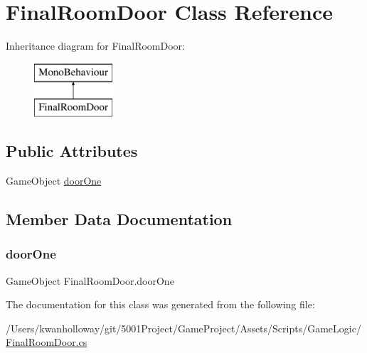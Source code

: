 \hypertarget{class_final_room_door}{}\section{Final\+Room\+Door Class Reference}
\label{class_final_room_door}
Inheritance diagram for Final\+Room\+Door\+:\begin{figure}[H]
\begin{center}
\leavevmode
\includegraphics[height=2.000000cm]{class_final_room_door}
\end{center}
\end{figure}
\subsection*{Public Attributes}
\begin{DoxyCompactItemize}
\item 
Game\+Object \hyperlink{class_final_room_door_a60613bd2f5b603777262b96ed07e87d0}{door\+One}
\end{DoxyCompactItemize}


\subsection{Member Data Documentation}
\mbox{\label{class_final_room_door_a60613bd2f5b603777262b96ed07e87d0}} 
\subsubsection{\texorpdfstring{door\+One}{doorOne}}
{\footnotesize\ttfamily Game\+Object Final\+Room\+Door.\+door\+One}



The documentation for this class was generated from the following file\+:\begin{DoxyCompactItemize}
\item 
/\+Users/kwanholloway/git/5001\+Project/\+Game\+Project/\+Assets/\+Scripts/\+Game\+Logic/\hyperlink{_final_room_door_8cs}{Final\+Room\+Door.\+cs}\end{DoxyCompactItemize}
